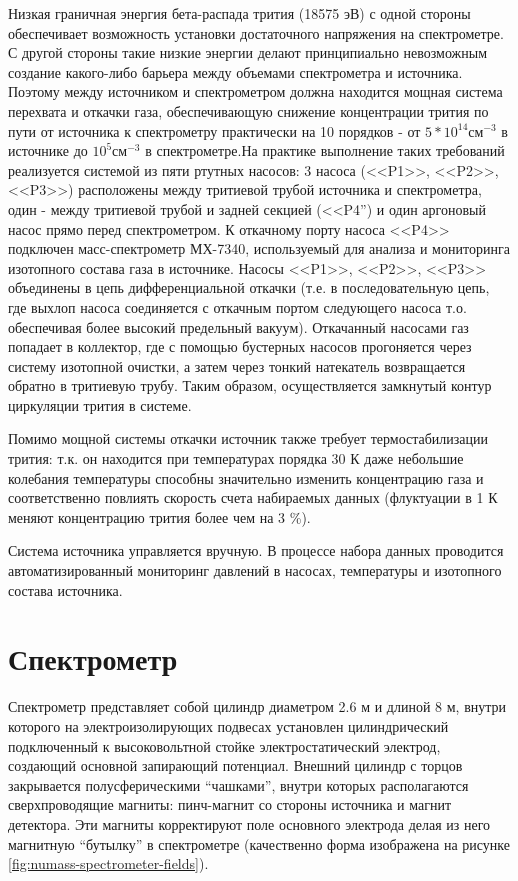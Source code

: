 \documentclass[a4paper,14pt]{extreport}
\begin{document}
Низкая граничная энергия бета-распада трития (18575 эВ) с одной стороны обеспечивает возможность установки достаточного напряжения на спектрометре. С другой стороны такие низкие энергии делают принципиально невозможным создание какого-либо барьера между объемами спектрометра и источника. Поэтому между источником и спектрометром должна находится мощная система перехвата и откачки газа, обеспечивающую снижение концентрации трития по пути от источника к спектрометру практически на 10 порядков - от $ 5 * 10^{14} \textbf{см}^{-3}$ в источнике до  $ 10^{5} \textbf{см}^{-3}$ в спектрометре.На практике выполнение таких требований реализуется системой из пяти ртутных насосов: 3 насоса (<<P1>>, <<P2>>, <<P3>>) расположены между тритиевой трубой источника и спектрометра, один - между тритиевой трубой и задней секцией (<<P4”) и один аргоновый насос прямо перед спектрометром. К откачному порту насоса <<P4>> подключен масс-спектрометр МХ-7340, используемый для анализа и мониторинга изотопного состава газа в источнике. Насосы <<P1>>, <<P2>>, <<P3>> объединены в цепь дифференциальной откачки (т.е. в последовательную цепь, где выхлоп насоса соединяется с откачным портом следующего насоса т.о. обеспечивая более высокий предельный вакуум). Откачанный насосами газ попадает в коллектор, где с помощью бустерных насосов прогоняется через систему изотопной очистки, а затем через тонкий натекатель возвращается обратно в тритиевую трубу. Таким образом, осуществляется замкнутый контур циркуляции трития в системе.

Помимо мощной системы откачки источник также требует термостабилизации трития: т.к. он находится при температурах порядка 30 К даже небольшие колебания температуры способны значительно изменить концентрацию газа и соответственно повлиять скорость счета набираемых данных (флуктуации в 1 К меняют концентрацию трития более чем на 3 \%).

Система источника управляется вручную. В процессе набора данных проводится автоматизированный мониторинг давлений в насосах, температуры и изотопного состава источника.

\section{Спектрометр}
Спектрометр представляет собой цилиндр диаметром 2.6 м и длиной 8 м, внутри которого на электроизолирующих подвесах установлен цилиндрический подключенный к высоковольтной стойке электростатический электрод, создающий основной запирающий потенциал. Внешний цилиндр с торцов закрывается полусферическими “чашками”, внутри которых располагаются сверхпроводящие магниты: пинч-магнит со стороны источника и магнит детектора. Эти магниты корректируют поле основного электрода делая из него магнитную “бутылку” в спектрометре (качественно форма изображена на рисунке \ref{fig:numass-spectrometer-fields}).
\end{document}
